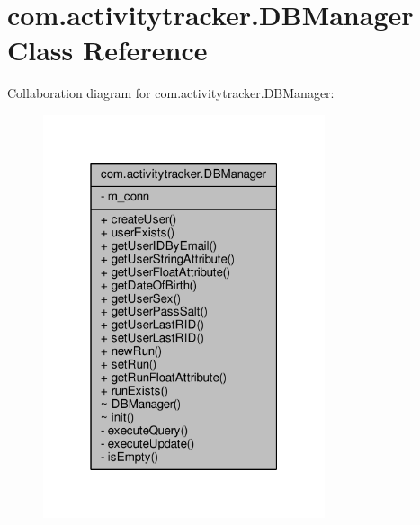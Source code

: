 \hypertarget{classcom_1_1activitytracker_1_1_d_b_manager}{}\section{com.\+activitytracker.\+D\+B\+Manager Class Reference}
\label{classcom_1_1activitytracker_1_1_d_b_manager}


Collaboration diagram for com.\+activitytracker.\+D\+B\+Manager\+:
\nopagebreak
\begin{figure}[H]
\begin{center}
\leavevmode
\includegraphics[width=235pt]{classcom_1_1activitytracker_1_1_d_b_manager__coll__graph}
\end{center}
\end{figure}

